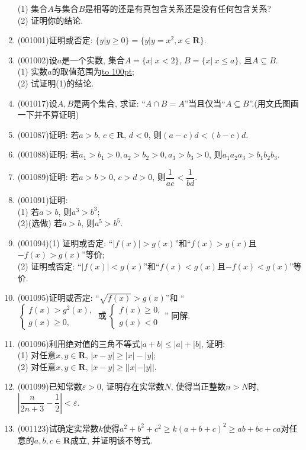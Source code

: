 \documentclass[10pt,a4paper]{article}
\newcommand{\blank}[1]{\underline{\hbox to #1pt{}}}
\begin{document}
\begin{enumerate}[1.]
(1) 集合$A$与集合$B$是相等的还是有真包含关系还是没有任何包含关系?\\ 
(2) 证明你的结论.
\item {\tiny (001001)}证明或否定: $\{y|y\ge 0\}=\{y|y=x^2, x \in \mathbf{R}\}$.
\item {\tiny (001002)}设$a$是一个实数, 集合$A=\{x|\ x<2\}$, $B=\{x|\ x\leq a\}$, 且$A \subseteq B$.\\ 
(1) 实数$a$的取值范围为\blank{100};\\ 
(2) 试证明(1)的结论.
\item {\tiny (001017)}设$A,B$是两个集合, 求证: ``$A\cap B=A$''当且仅当``$A \subseteq B$''.(用文氏图画一下并不算证明)
\item {\tiny (001087)}证明: 若$a>b$, $c\in\mathbf{R}$, $d<0$, 则$(a-c)d<(b-c)d$.
\item {\tiny (001088)}证明: 若$a_1>b_1>0,a_2>b_2>0,a_3>b_3>0$, 则$a_1a_2a_3>b_1b_2b_3$.
\item {\tiny (001089)}证明: 若$a>b>0$, $c>d>0$, 则$\dfrac{1}{ac}<\dfrac{1}{bd}$.
\item {\tiny (001091)}证明:\\ 
(1) 若$a>b$, 则$a^3>b^3$;\\ 
(2)(选做) 若$a>b$, 则$a^5>b^5$.
\item {\tiny (001094)}(1) 证明或否定: ``$|f(x)|>g(x)$''和``$f(x)>g(x)$且$-f(x)>g(x)$''等价;\\ 
(2) 证明或否定: ``$|f(x)|<g(x)$''和``$f(x)<g(x)$且$-f(x)<g(x)$''等价.
\item {\tiny (001095)}证明或否定: ``$\sqrt{f(x)}>g(x)$''和
``$\left\{\begin{array}{l}f(x)>g^2(x),\\g(x)\ge 0,\end{array}\right.\ \text{或} \ \left\{\begin{array}{l}f(x)\ge 0,\\g(x)<0\end{array}\right.$''
同解.
\item {\tiny (001096)}利用绝对值的三角不等式$|a+b|\le |a|+|b|$, 证明:\\ 
(1) 对任意$x,y\in\mathbf{R}$, $|x-y|\ge |x|-|y|$;\\ 
(2) 对任意$x,y\in\mathbf{R}$, $|x-y|\ge ||x|-|y||$.
\item {\tiny (001099)}已知常数$\varepsilon>0$, 证明存在实常数$N$, 使得当正整数$n>N$时, $\left|\dfrac{n}{2n+3}-\dfrac{1}{2}\right|<\varepsilon$.
\item {\tiny (001123)}试确定实常数$k$使得$a^2+b^2+c^2\geq k(a+b+c)^2\geq ab+bc+ca$对任意的$a,b,c\in \mathbf{R}$成立, 并证明该不等式.

\end{enumerate}
\end{document}
